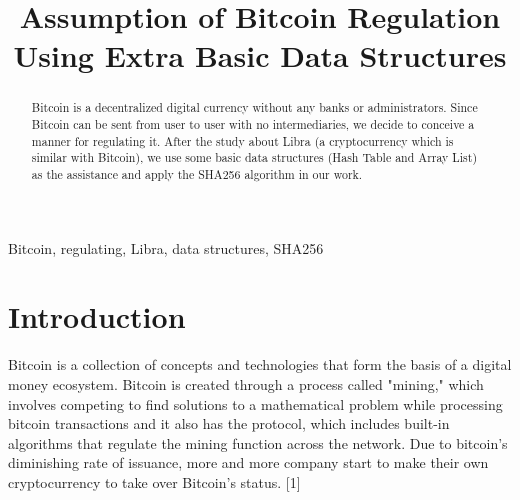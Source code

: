 \documentclass[conference]{IEEEtran}
\begin{document}
\title{Assumption of Bitcoin Regulation Using Extra Basic Data Structures \\
}

\author{
\and
{}
\and
{}
}

\maketitle

\begin{abstract}
Bitcoin is a decentralized digital currency without any banks or administrators. Since Bitcoin can be sent from user to user with no intermediaries, we decide to conceive a manner for regulating it. After the study about Libra (a cryptocurrency which is similar with Bitcoin), we use some basic data structures (Hash Table and Array List) as the assistance and apply the SHA256 algorithm in our work. 
\end{abstract}

\begin{IEEEkeywords}
Bitcoin, regulating, Libra, data structures, SHA256
\end{IEEEkeywords}

\section{Introduction}
Bitcoin is a collection of concepts and technologies that form the basis of a digital money ecosystem.  Bitcoin is created through a process called "mining," which involves competing to find solutions to a mathematical problem while processing bitcoin transactions and it also has the protocol, which includes built-in algorithms that regulate the mining function across the network. Due to bitcoin’s diminishing rate of issuance, more and more company start to make their own cryptocurrency to take over Bitcoin’s status. [1]
\end{document}
